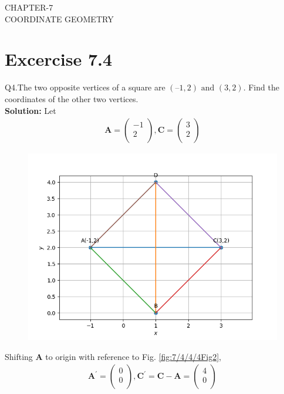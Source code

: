 \documentclass[12pt]{article}
\newcommand{\solution}{\noindent \textbf{Solution: }}
\newcommand{\myvec}[1]{\ensuremath{\begin{pmatrix}#1\end{pmatrix}}}
\let\vec\mathbf
\begin{document}
\begin{center}
\textbf\large{CHAPTER-7 \\ COORDINATE GEOMETRY}

\end{center}
\section*{Excercise 7.4}

Q4.The two opposite vertices of a square are $(–1, 2) \text{ and } (3, 2)$. Find the coordinates of the other two vertices.\\
\fi
\solution
Let
\begin{align}
\vec{A} = \myvec
{
-1 \\
 2\\
},
\vec{C} = 
\myvec
{
3\\
2\\
}
\end{align}

\begin{figure}[!h]
	\begin{center} 
	    \includegraphics[width=\columnwidth]{chapters/10/7/4/4/figs/square}
	\end{center}
\caption{}
\label{fig:7/4/4/4Fig1}
\end{figure}

Shifting $\vec{A}$ to origin with reference to Fig. \ref{fig:7/4/4/4Fig2},
\begin{align}
\vec{A^{\prime}} =
\myvec{
0 \\
0\\
},
\vec{C^{\prime}} = \vec{C}-\vec{A} = 
\myvec{
4 \\
0\\
}
\end{align}
\end{document}
